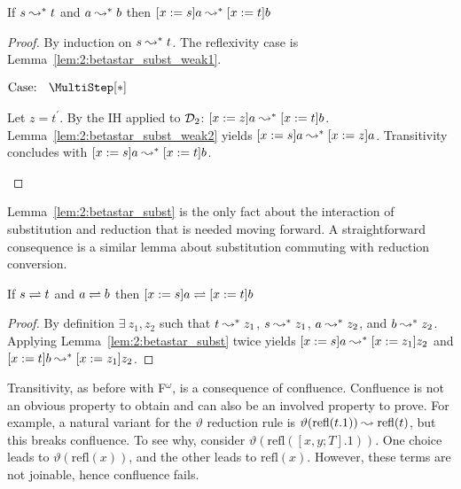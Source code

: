 \begin{lemma}
    If $s \leadsto^* t$ and $a \leadsto^* b$ then $[x := s]a \leadsto^* [x := t]b$
    \label{lem:2:betastar_subst}
\end{lemma}
\begin{proof}
    By induction on $s \leadsto^* t$.
    The reflexivity case is Lemma~\ref{lem:2:betastar_subst_weak1}.

    $\text{Case: }\begin{array}{c} \MultiStep[*] \end{array}$
    \begin{proofcase}
        Let $z = t^\prime$.
        By the IH applied to $\mathcal{D}_{2}$: $[x := z]a \leadsto^* [x := t]b$.
        Lemma~\ref{lem:2:betastar_subst_weak2} yields $[x := s]a \leadsto^* [x := z]a$.
        Transitivity concludes with $[x := s]a \leadsto^* [x := t]b$.
    \end{proofcase}
\end{proof}

Lemma~\ref{lem:2:betastar_subst} is the only fact about the interaction of substitution and reduction that is needed moving forward.
A straightforward consequence is a similar lemma about substitution commuting with reduction conversion.

\begin{lemma}
    If $s \rightleftharpoons t$ and $a \rightleftharpoons b$ then $[x := s]a \rightleftharpoons [x := t]b$
    \label{lem:2:betaconv_subst}
\end{lemma}
\begin{proof}
    By definition $\exists\ z_1, z_2$ such that $t \leadsto^* z_1$, $s \leadsto^* z_1$, $a \leadsto^* z_2$, and $b \leadsto^* z_2$.
    Applying Lemma~\ref{lem:2:betastar_subst} twice yields $[x := s]a \leadsto^* [x := z_1]z_2$ and $[x := t]b \leadsto^* [x := z_1]z_2$.
\end{proof}

Transitivity, as before with F$^\omega$, is a consequence of confluence.
Confluence is not an obvious property to obtain and can also be an involved property to prove.
For example, a natural variant for the $\vartheta$ reduction rule is $\vartheta(\text{refl}(t.1)) \leadsto \text{refl}(t)$, but this breaks confluence.
To see why, consider $\vartheta(\text{refl}([x, y; T].1))$.
One choice leads to $\vartheta(\text{refl}(x))$, and the other leads to $\text{refl}(x)$.
However, these terms are not joinable, hence confluence fails.
